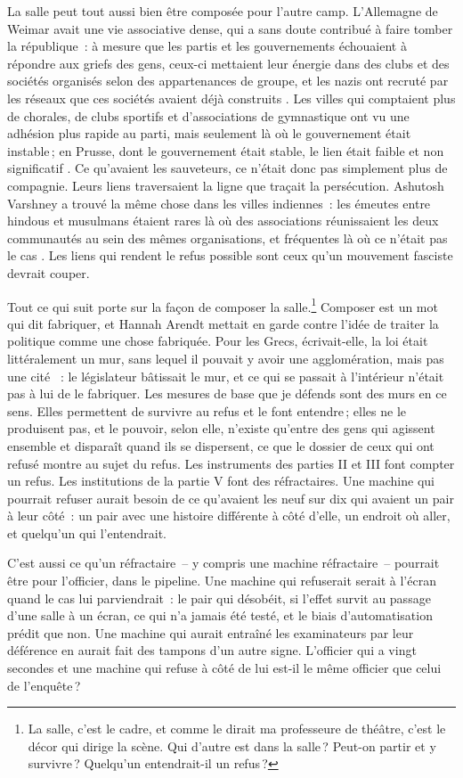 La salle peut tout aussi bien être composée pour l'autre camp. L'Allemagne de Weimar avait une vie associative dense, qui a sans doute contribué à faire tomber la république~: à mesure que les partis et les gouvernements échouaient à répondre aux griefs des gens, ceux-ci mettaient leur énergie dans des clubs et des sociétés organisés selon des appartenances de groupe, et les nazis ont recruté par les réseaux que ces sociétés avaient déjà construits \autocite{berman1997weimar}. Les villes qui comptaient plus de chorales, de clubs sportifs et d'associations de gymnastique ont vu une adhésion plus rapide au parti, mais seulement là où le gouvernement était instable\,; en Prusse, dont le gouvernement était stable, le lien était faible et non significatif \autocite{satyanath2017bowling}. Ce qu'avaient les sauveteurs, ce n'était donc pas simplement plus de compagnie. Leurs liens traversaient la ligne que traçait la persécution. Ashutosh Varshney a trouvé la même chose dans les villes indiennes~: les émeutes entre hindous et musulmans étaient rares là où des associations réunissaient les deux communautés au sein des mêmes organisations, et fréquentes là où ce n'était pas le cas \autocite{varshney2002ethnic}. Les liens qui rendent le refus possible sont ceux qu'un mouvement fasciste devrait couper.

Tout ce qui suit porte sur la façon de composer la salle.\footnote{La salle, c'est le cadre, et comme le dirait ma professeure de théâtre, c'est le décor qui dirige la scène. Qui d'autre est dans la salle\,? Peut-on partir et y survivre\,? Quelqu'un entendrait-il un refus\,?} Composer est un mot qui dit fabriquer, et Hannah Arendt mettait en garde contre l'idée de traiter la politique comme une chose fabriquée. Pour les Grecs, écrivait-elle, la loi était littéralement un mur, sans lequel il pouvait y avoir une agglomération, mais pas une cité \autocite{arendt1958human}~: le législateur bâtissait le mur, et ce qui se passait à l'intérieur n'était pas à lui de le fabriquer. Les mesures de base que je défends sont des murs en ce sens. Elles permettent de survivre au refus et le font entendre\,; elles ne le produisent pas, et le pouvoir, selon elle, n'existe qu'entre des gens qui agissent ensemble et disparaît quand ils se dispersent, ce que le dossier de ceux qui ont refusé montre au sujet du refus. Les instruments des parties II et III font compter un refus. Les institutions de la partie V font des réfractaires. Une machine qui pourrait refuser aurait besoin de ce qu'avaient les neuf sur dix qui avaient un pair à leur côté~: un pair avec une histoire différente à côté d'elle, un endroit où aller, et quelqu'un qui l'entendrait.

C'est aussi ce qu'un réfractaire~– y compris une machine réfractaire~– pourrait être pour l'officier, dans le pipeline. Une machine qui refuserait serait à l'écran quand le cas lui parviendrait~: le pair qui désobéit, si l'effet survit au passage d'une salle à un écran, ce qui n'a jamais été testé, et le biais d'automatisation prédit que non. Une machine qui aurait entraîné les examinateurs par leur déférence en aurait fait des tampons d'un autre signe. L'officier qui a vingt secondes et une machine qui refuse à côté de lui est-il le même officier que celui de l'enquête\,?
